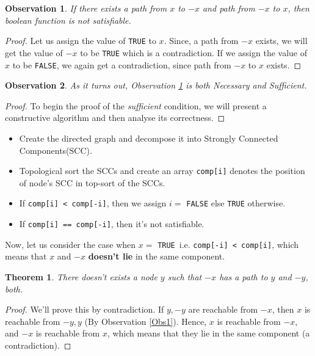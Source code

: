 \documentclass{article}
\newtheorem{theorem}{Theorem}[section]
\newtheorem{observation}{Observation}[section]
\theoremstyle{definition}
\newcommand{\true}{\texttt{TRUE}}
\begin{document}
\begin{observation}
    \label{Necessary}
    If there exists a path from $x$ to $-x$ and path from $-x$ to $x$, then
    boolean function is not satisfiable.
\end{observation}

\begin{proof}
    Let us assign the value of \texttt{TRUE} to $x$. Since, a path from $-x$ exists,
    we will get the value of $-x$ to be \texttt{TRUE} which is a contradiction.
    If we assign the value of $x$ to be \texttt{FALSE}, we again get a contradiction,
    since path from $-x$ to $x$ exists. 
\end{proof}

\begin{observation}
    As it turns out, Observation \ref{Necessary} is both Necessary and Sufficient.
\end{observation}

\begin{proof}
    To begin the proof of the \textit{sufficient} condition, we will present a constructive
    algorithm and then analyse its correctness.
\end{proof}
    \begin{mdframed}[frametitle = Algorithm, style = exampledefault]
        \begin{itemize}
            \item Create the directed graph and decompose it into Strongly Connected Components(SCC).
            \item Topological sort the SCCs and create an array \texttt{comp[i]} denotes the position of node's SCC in top-sort of the SCCs.
            \item If \texttt{comp[i] < comp[-i]}, then we assign $i =$ \texttt{FALSE} else \texttt{TRUE} otherwise.
            \item If \texttt{comp[i] == comp[-i]}, then it's not satisfiable.
        \end{itemize}
    \end{mdframed}
    Now, let us consider the case when $x = $ \true\ i.e. \texttt{comp[-i] < comp[i]},
    which means that $x$ and $-x$ \textbf{doesn't lie} in the same component.

\begin{theorem}
    There doesn't exists a node $y$ such that $-x$ has a path to $y$ and $-y$, both.
\end{theorem}

\begin{proof}
    We'll prove this by contradiction. If $y, -y$ are reachable from $-x$, then $x$ is reachable from $-y, y$
    (By Observation \ref{Obs1}). Hence, $x$ is reachable from $-x$, and $-x$ is reachable from $x$, which means
    that they lie in the same component (a contradiction).
\end{proof}
\end{document}

